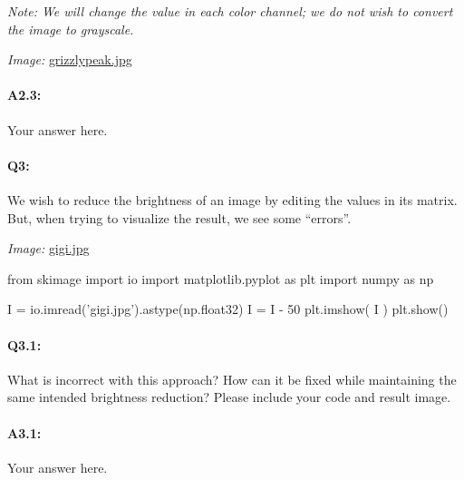 \documentclass[11pt]{article}
\begin{document}
\emph{Note: We will change the value in each color channel; we do not wish to convert the image to grayscale.}

\emph{Image:} \href{grizzlypeak.jpg}{grizzlypeak.jpg}

\paragraph{A2.3:} Your answer here.




\pagebreak
\paragraph{Q3:} We wish to reduce the brightness of an image by editing the values in its matrix. But, when trying to visualize the result, we see some ``errors''.

\emph{Image:} \href{gigi.jpg}{gigi.jpg}

\begin{python}
from skimage import io
import matplotlib.pyplot as plt
import numpy as np

I =  io.imread('gigi.jpg').astype(np.float32)
I = I - 50
plt.imshow( I )
plt.show()
\end{python}

\paragraph{Q3.1:} What is incorrect with this approach? How can it be fixed while maintaining the same intended brightness reduction? Please include your code and result image.

\paragraph{A3.1:} Your answer here.





\end{document}

